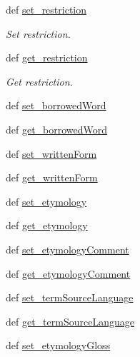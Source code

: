 \begin{DoxyCompactItemize}
def \hyperlink{classlmf_1_1src_1_1core_1_1statement_1_1_statement_a66ff1951ce0a2b839f2ab4c1f5447426}{set\+\_\+restriction}
\begin{DoxyCompactList}\small\item\em Set restriction. \end{DoxyCompactList}\item 
def \hyperlink{classlmf_1_1src_1_1core_1_1statement_1_1_statement_ab85c880e48d2123caaed25d78bd32c76}{get\+\_\+restriction}
\begin{DoxyCompactList}\small\item\em Get restriction. \end{DoxyCompactList}\item 
def \hyperlink{classlmf_1_1src_1_1core_1_1statement_1_1_statement_abf1eb5ffc95de2aedde3fbc57ba9a795}{set\+\_\+borrowed\+Word}
\item 
def \hyperlink{classlmf_1_1src_1_1core_1_1statement_1_1_statement_a4d211071167d9b64b90a8863bccdba47}{get\+\_\+borrowed\+Word}
\item 
def \hyperlink{classlmf_1_1src_1_1core_1_1statement_1_1_statement_a0a666409b4347a2e1fc306c776403644}{set\+\_\+written\+Form}
\item 
def \hyperlink{classlmf_1_1src_1_1core_1_1statement_1_1_statement_ad76ee83090f177477973b3318f14e4e3}{get\+\_\+written\+Form}
\item 
def \hyperlink{classlmf_1_1src_1_1core_1_1statement_1_1_statement_a77b0a232ce93b2cc0495ee63064e286d}{set\+\_\+etymology}
\item 
def \hyperlink{classlmf_1_1src_1_1core_1_1statement_1_1_statement_a680c28452d3c0e819db589479e364441}{get\+\_\+etymology}
\item 
def \hyperlink{classlmf_1_1src_1_1core_1_1statement_1_1_statement_abcd99a1f9adf0b86fe0648d3d5d0c745}{set\+\_\+etymology\+Comment}
\item 
def \hyperlink{classlmf_1_1src_1_1core_1_1statement_1_1_statement_ad64f4d82e8aac9ca2e106673195adef2}{get\+\_\+etymology\+Comment}
\item 
def \hyperlink{classlmf_1_1src_1_1core_1_1statement_1_1_statement_a2559e6c441e8b9c1276ea7f7ae765f1d}{set\+\_\+term\+Source\+Language}
\item 
def \hyperlink{classlmf_1_1src_1_1core_1_1statement_1_1_statement_ab63acc79afef490f7e9c748c57452d9c}{get\+\_\+term\+Source\+Language}
\item 
def \hyperlink{classlmf_1_1src_1_1core_1_1statement_1_1_statement_ad5405bae6d97fb2a64ab75748c1122a5}{set\+\_\+etymology\+Gloss}

\end{DoxyCompactItemize}
